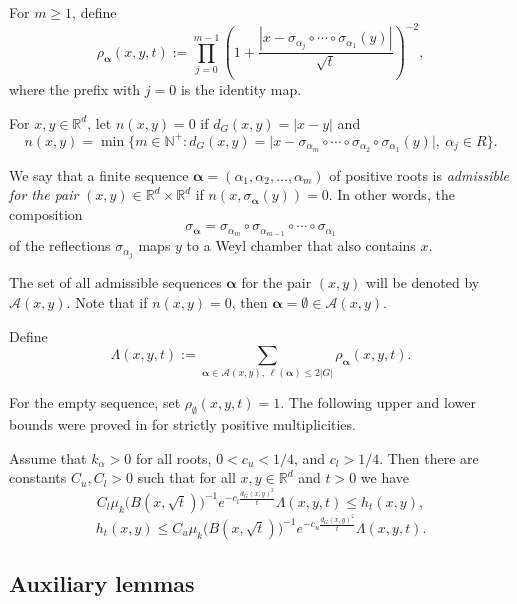 \documentclass[12pt]{article}
\begin{document}
For $m\ge1$, define
\[
\rho_{\boldsymbol{\alpha}}(x,y,t):=\prod_{j=0}^{m-1}\left(1+\frac{|x-\sigma_{\alpha_j}\circ\cdots\circ\sigma_{\alpha_1}(y)|}{\sqrt{t}}\right)^{-2},
\]
where the prefix with $j=0$ is the identity map.

For $x,y\in\mathbb{R}^d$, let $n(x,y)=0$ if $d_G(x,y)=|x-y|$ and
\[
n(x,y)=\min\bigl\{m\in\mathbb{N}^+: d_G(x,y)=\bigl|x-\sigma_{\alpha_m}\circ\cdots\circ\sigma_{\alpha_2}\circ\sigma_{\alpha_1}(y)\bigr|,\ \alpha_j\in R\bigr\}.
\]

We say that a finite sequence $\boldsymbol{\alpha}=(\alpha_1,\alpha_2,\dots,\alpha_m)$ of positive roots is \textit{admissible for the pair} $(x,y)\in\mathbb{R}^d\times\mathbb{R}^d$ if $n(x,\sigma_{\boldsymbol{\alpha}}(y))=0$. In other words, the composition
\[
\sigma_{\boldsymbol{\alpha}}=\sigma_{\alpha_m}\circ\sigma_{\alpha_{m-1}}\circ\cdots\circ\sigma_{\alpha_1}
\]
of the reflections $\sigma_{\alpha_j}$ maps $y$ to a Weyl chamber that also contains $x$.

The set of all admissible sequences $\boldsymbol{\alpha}$ for the pair $(x,y)$ will be denoted by $\mathcal{A}(x,y)$. Note that if $n(x,y)=0$, then $\boldsymbol{\alpha}=\emptyset\in\mathcal{A}(x,y)$.

Define
\begin{equation}\label{eq:1.7}
\Lambda(x,y,t):=\sum_{\boldsymbol{\alpha}\in\mathcal{A}(x,y),\,\ell(\boldsymbol{\alpha})\le 2|G|}\rho_{\boldsymbol{\alpha}}(x,y,t).
\end{equation}

For the empty sequence, set $\rho_{\emptyset}(x,y,t)=1$. The following upper and lower bounds were proved in \cite{JDA1} for strictly positive multiplicities.
\begin{lemma}\label{LBOUND}
Assume that $k_\alpha>0$ for all roots, $0<c_u<1/4$, and $c_l>1/4$. Then there are constants $C_u, C_l > 0$ such that for all $x, y \in \mathbb{R}^d$ and $t > 0$ we have
\begin{equation}\label{E2.1}
C_l \mu_k\big(B(x, \sqrt{t})\big)^{-1} e^{-c_l \frac{d_G(x,y)^2}{t}} \Lambda(x, y, t) \leq h_t(x, y),
\end{equation}
\begin{equation}\label{E2.2}
h_t(x, y) \leq C_u \mu_k\big(B(x, \sqrt{t})\big)^{-1} e^{-c_u \frac{d_G(x,y)^2}{t}} \Lambda(x, y, t).
\end{equation}
\end{lemma}

\subsection{Auxiliary lemmas}
\end{document}
